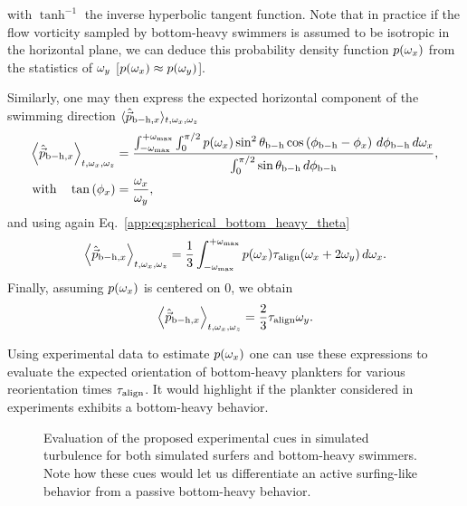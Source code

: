 with $\tanh^{-1}$ the inverse hyperbolic tangent function.
Note that in practice if the flow vorticity sampled by bottom-heavy swimmers is assumed to be isotropic in the horizontal plane, we can deduce this probability density function $p(\omega_x)$ from the statistics of $\omega_{y}$ [$p(\omega_x) \approx p(\omega_y)$].

Similarly, one may then express the expected horizontal component of the swimming direction $\langle \hat{\vec{p}}_{\mathrm{b-h}, x} \rangle_{t, \omega_x, \omega_z}$
\begin{subequations}
	\begin{align}
		\left\langle \hat{\vec{p}}_{\mathrm{b-h}, x} \right\rangle_{t, \omega_x, \omega_z} &= \frac{\int_{-\omega_{\max}}^{+\omega_{\max}} \int_0^{\pi/2} p(\omega_x) \sin^2 \theta_{\mathrm{b-h}} \cos \left( \phi_{\mathrm{b-h}} - \phi_x \right) \, d \phi_{\mathrm{b-h}} \, d\omega_x}{\int_0^{\pi/2} \sin \theta_{\mathrm{b-h}} \, d \phi_{\mathrm{b-h}}},\\
		\text{with} \quad \tan \left( \phi_x \right) &= \frac{\omega_x}{\omega_y},
	\end{align}
\end{subequations}
and using again Eq.~\eqref{app:eq:spherical_bottom_heavy_theta}
\begin{equation}
	\left\langle \hat{\vec{p}}_{\mathrm{b-h}, x} \right\rangle_{t, \omega_x, \omega_z} = \frac{1}{3} \int_{-\omega_{\max}}^{+\omega_{\max}} p(\omega_x) \tau_{\mathrm{align}} ( \omega_x + 2 \omega_y) \, d\omega_x.
\end{equation}
Finally, assuming $p(\omega_x)$ is centered on $0$, we obtain
\begin{equation}
	\left\langle \hat{\vec{p}}_{\mathrm{b-h}, x} \right\rangle_{t, \omega_x, \omega_z} = \frac{2}{3} \tau_{\mathrm{align}} \omega_y.
\end{equation}

Using experimental data to estimate $p(\omega_x)$ one can use these expressions to evaluate the expected orientation of bottom-heavy plankters for various reorientation times $\tau_{\mathrm{align}}$.
It would highlight if the plankter considered in experiments exhibits a bottom-heavy behavior.
\begin{figure}
	\centering
	
	\caption[Evaluation of the proposed experimental cues in simulated turbulence.]{
		Evaluation of the proposed experimental cues in simulated turbulence for both simulated surfers and bottom-heavy swimmers.
		Note how these cues would let us differentiate an active surfing-like behavior from a passive bottom-heavy behavior.
	}
	\label{fig:experimental_cues}
\end{figure}

